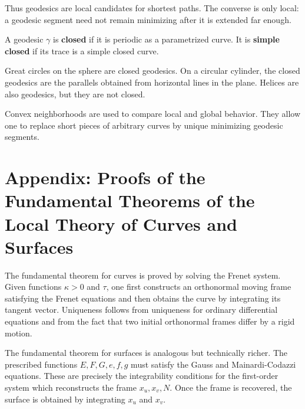 \documentclass[12pt, oneside]{book}
\begin{document}
\begin{remark}
    Thus geodesics are local candidates for shortest paths.  The converse is
    only local: a geodesic segment need not remain minimizing after it is
    extended far enough.
\end{remark}

\begin{definition}
    A geodesic $\gamma$ is \textbf{closed} if it is periodic as a parametrized
    curve.  It is \textbf{simple closed} if its trace is a simple closed curve.
\end{definition}

\begin{example}
    Great circles on the sphere are closed geodesics.  On a circular cylinder,
    the closed geodesics are the parallels obtained from horizontal lines in
    the plane.  Helices are also geodesics, but they are not closed.
\end{example}

\begin{remark}
    Convex neighborhoods are used to compare local and global behavior.  They
    allow one to replace short pieces of arbitrary curves by unique minimizing
    geodesic segments.
\end{remark}

\section*{Appendix: Proofs of the Fundamental Theorems of the Local Theory of Curves and Surfaces}

\begin{remark}
    The fundamental theorem for curves is proved by solving the Frenet system.
    Given functions $\kappa>0$ and $\tau$, one first constructs an orthonormal
    moving frame satisfying the Frenet equations and then obtains the curve by
    integrating its tangent vector.  Uniqueness follows from uniqueness for
    ordinary differential equations and from the fact that two initial
    orthonormal frames differ by a rigid motion.
\end{remark}

\begin{remark}
    The fundamental theorem for surfaces is analogous but technically richer.
    The prescribed functions $E,F,G,e,f,g$ must satisfy the Gauss and
    Mainardi-Codazzi equations.  These are precisely the integrability
    conditions for the first-order system which reconstructs the frame
    $x_u,x_v,N$.  Once the frame is recovered, the surface is obtained by
    integrating $x_u$ and $x_v$.
\end{remark}
\end{document}
